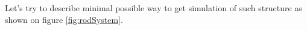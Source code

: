 
\par
Let's try to describe minimal possible way to get simulation of such structure
as shown on figure \ref{fig:rodSystem}.

